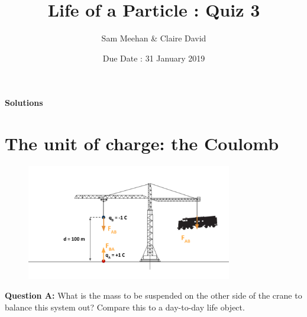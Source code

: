 \documentclass[12pt]{article}
\title{Life of a Particle : Quiz 3}
\author{Sam Meehan \& Claire David}
\date{Due Date : 31 January 2019}
\begin{document}
\maketitle

\begin{center}
\begin{LARGE} {\color{red} \textbf{Solutions}} \end{LARGE}\end{center}


\section{The unit of charge: the Coulomb}
% 
 \begin{figure}[h]
     \centering
     \includegraphics[width=0.8\textwidth]{crane_solution_quiz_part2_1.png}
\end{figure}

\textbf{Question A:} What is the mass to be suspended on the other side of the crane to balance this system out? Compare this to a day-to-day life object.\\
\end{document}
